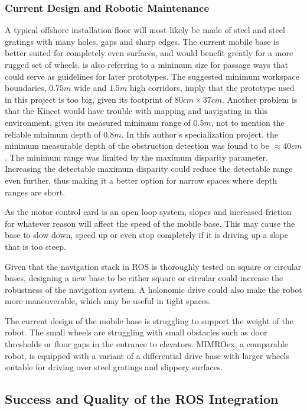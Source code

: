 \subsubsection{Current Design and Robotic Maintenance}
\label{sec:design_maintenance}
A typical offshore installation floor will most likely be made of steel and steel gratings with many holes, gaps and sharp edges\cite{graf2008mobile}. The current mobile base is better suited for completely even surfaces, and would benefit greatly for a more rugged set of wheels. \cite{graf2008mobile} is also referring to a minimum size for passage ways that could serve as guidelines for later prototypes. The suggested minimum workspace boundaries, $0.75m$ wide and $1.5m$ high corridors, imply that the prototype used in this project is too big, given its footprint of $80cm \times 37 cm$. Another problem is that the Kinect would have trouble with mapping and navigating in this environment, given its measured minimum range of $0.5m$, not to mention the reliable minimum depth of $0.8m$. In this author's specialization project\cite{lindrup}, the minimum measurable depth of the obstruction detection was found to be $\approx 40 cm$. The minimum range was limited by the maximum disparity parameter. Increasing the detectable maximum disparity could reduce the detectable range even further, thus making it a better option for narrow spaces where depth ranges are short. 

As the motor control card is an open loop system, slopes and increased friction for whatever reason will affect the speed of the mobile base. This may cause the base to slow down, speed up or even stop completely if it is driving up a slope that is too steep.

Given that the navigation stack in \ac{ROS} is thoroughly tested on square or circular bases, designing a new base to be either square or circular could increase the robustness of the navigation system. A holonomic drive could also make the robot more maneuverable, which may be useful in tight spaces.

The current design of the mobile base is struggling to support the weight of the robot. The small wheels are struggling with small obstacles such as door thresholds or floor gaps in the entrance to elevators. \ac{MIMROex}, a comparable robot, is equipped with a variant of a differential drive base with larger wheels suitable for driving over steel gratings and slippery surfaces.

\subsection{Success and Quality of the ROS Integration}

